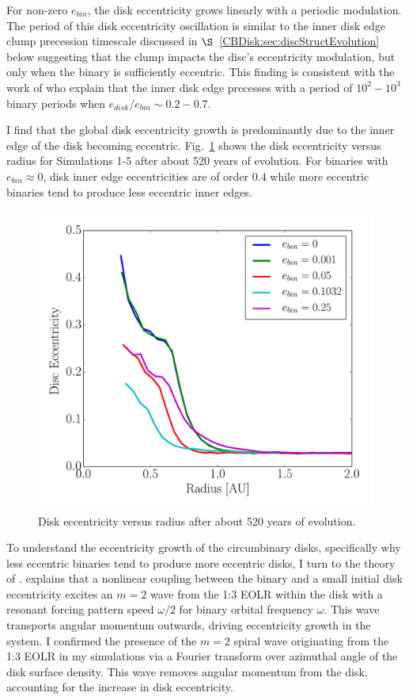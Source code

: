 For non-zero $e_{bin}$, the disk eccentricity grows linearly with a
periodic modulation.  The period of this disk eccentricity oscillation
is similar to the inner disk edge clump precession timescale discussed
in $\S$~\ref{CBDisk:sec:discStructEvolution} below suggesting that the clump impacts the disc's eccentricity modulation, but only when the binary is sufficiently eccentric.  This finding is consistent with the work of \citet{Artymowicz2000} who explain that the inner disk edge precesses with a period of $10^2 - 10^3$ binary periods when $e_{disk}/e_{bin} \sim 0.2-0.7$.  

I find that the global disk eccentricity growth is predominantly due to the inner edge of the disk becoming eccentric.  Fig.~\ref{fig:CBDiskDiskEccRad} shows the disk eccentricity versus radius for Simulations 1-5 after about 520 years of evolution.  For binaries with $e_{bin} \approx 0$, disk inner edge eccentricities are of order 0.4 while more eccentric binaries tend to produce less eccentric inner edges.

\begin{figure}
	\includegraphics[width=\columnwidth]{f3}
    \caption{Disk eccentricity versus radius after about 520 years of evolution.}
    \label{fig:CBDiskDiskEccRad}
\end{figure}

To understand the eccentricity growth of the circumbinary disks,
specifically why less eccentric binaries tend to produce more
eccentric disks, I turn to the theory of \citet{Papaloizou2001}.
\citet{Papaloizou2001} explains that a nonlinear coupling between the
binary and a small initial disk eccentricity excites an $m = 2$ wave
from the 1:3 EOLR within the disk with a resonant forcing pattern
speed $\omega/2$ for binary orbital frequency $\omega$.  This wave
transports angular momentum outwards, driving eccentricity growth in
the system.  I confirmed the presence of the $m = 2$ spiral wave
originating from the 1:3 EOLR in my simulations via a Fourier transform over azimuthal
angle of the disk surface density.  This wave removes angular momentum from the disk, accounting for the increase in disk eccentricity.  

